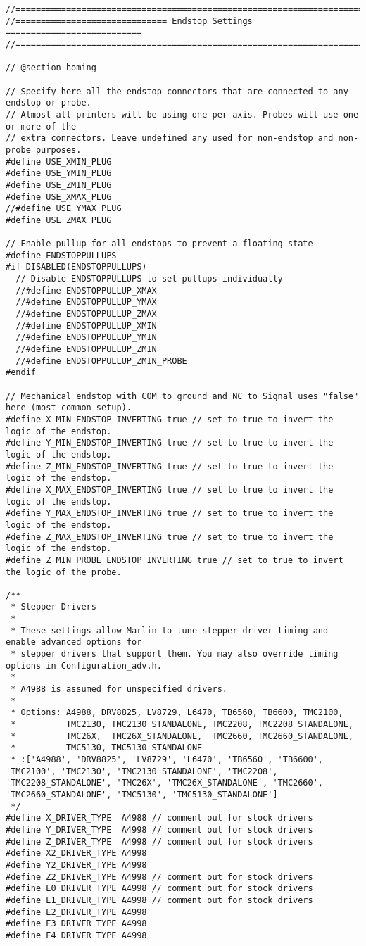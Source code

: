 \begin{lstlisting}
//===========================================================================
//============================== Endstop Settings ===========================
//===========================================================================

// @section homing

// Specify here all the endstop connectors that are connected to any endstop or probe.
// Almost all printers will be using one per axis. Probes will use one or more of the
// extra connectors. Leave undefined any used for non-endstop and non-probe purposes.
#define USE_XMIN_PLUG
#define USE_YMIN_PLUG
#define USE_ZMIN_PLUG
#define USE_XMAX_PLUG
//#define USE_YMAX_PLUG
#define USE_ZMAX_PLUG

// Enable pullup for all endstops to prevent a floating state
#define ENDSTOPPULLUPS
#if DISABLED(ENDSTOPPULLUPS)
  // Disable ENDSTOPPULLUPS to set pullups individually
  //#define ENDSTOPPULLUP_XMAX
  //#define ENDSTOPPULLUP_YMAX
  //#define ENDSTOPPULLUP_ZMAX
  //#define ENDSTOPPULLUP_XMIN
  //#define ENDSTOPPULLUP_YMIN
  //#define ENDSTOPPULLUP_ZMIN
  //#define ENDSTOPPULLUP_ZMIN_PROBE
#endif

// Mechanical endstop with COM to ground and NC to Signal uses "false" here (most common setup).
#define X_MIN_ENDSTOP_INVERTING true // set to true to invert the logic of the endstop.
#define Y_MIN_ENDSTOP_INVERTING true // set to true to invert the logic of the endstop.
#define Z_MIN_ENDSTOP_INVERTING true // set to true to invert the logic of the endstop.
#define X_MAX_ENDSTOP_INVERTING true // set to true to invert the logic of the endstop.
#define Y_MAX_ENDSTOP_INVERTING true // set to true to invert the logic of the endstop.
#define Z_MAX_ENDSTOP_INVERTING true // set to true to invert the logic of the endstop.
#define Z_MIN_PROBE_ENDSTOP_INVERTING true // set to true to invert the logic of the probe.

/**
 * Stepper Drivers
 *
 * These settings allow Marlin to tune stepper driver timing and enable advanced options for
 * stepper drivers that support them. You may also override timing options in Configuration_adv.h.
 *
 * A4988 is assumed for unspecified drivers.
 *
 * Options: A4988, DRV8825, LV8729, L6470, TB6560, TB6600, TMC2100,
 *          TMC2130, TMC2130_STANDALONE, TMC2208, TMC2208_STANDALONE,
 *          TMC26X,  TMC26X_STANDALONE,  TMC2660, TMC2660_STANDALONE,
 *          TMC5130, TMC5130_STANDALONE
 * :['A4988', 'DRV8825', 'LV8729', 'L6470', 'TB6560', 'TB6600', 'TMC2100', 'TMC2130', 'TMC2130_STANDALONE', 'TMC2208', 'TMC2208_STANDALONE', 'TMC26X', 'TMC26X_STANDALONE', 'TMC2660', 'TMC2660_STANDALONE', 'TMC5130', 'TMC5130_STANDALONE']
 */
#define X_DRIVER_TYPE  A4988 // comment out for stock drivers
#define Y_DRIVER_TYPE  A4998 // comment out for stock drivers
#define Z_DRIVER_TYPE  A4998 // comment out for stock drivers
#define X2_DRIVER_TYPE A4998
#define Y2_DRIVER_TYPE A4998
#define Z2_DRIVER_TYPE A4998 // comment out for stock drivers
#define E0_DRIVER_TYPE A4998 // comment out for stock drivers
#define E1_DRIVER_TYPE A4998 // comment out for stock drivers
#define E2_DRIVER_TYPE A4998
#define E3_DRIVER_TYPE A4998
#define E4_DRIVER_TYPE A4998


\end{lstlisting}
